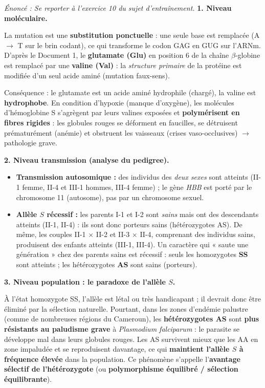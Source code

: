 \documentclass[11pt]{article}
\begin{document}
\begin{corrige}
\textit{Énoncé : Se reporter à l'exercice 10 du sujet d'entraînement.}
\tcblower
\textbf{1. Niveau moléculaire.}

La mutation est une \textbf{substitution ponctuelle} : une seule base est remplacée (A $\to$ T sur le brin codant), ce qui transforme le codon GAG en GUG sur l'ARNm. D'après le Document 1, le \textbf{glutamate (Glu)} en position 6 de la chaîne $\beta$-globine est remplacé par une \textbf{valine (Val)} : la \emph{structure primaire} de la protéine est modifiée d'un seul acide aminé (mutation faux-sens).

Conséquence : le glutamate est un acide aminé hydrophile (chargé), la valine est \textbf{hydrophobe}. En condition d'hypoxie (manque d'oxygène), les molécules d'hémoglobine S s'agrègent par leurs valines exposées et \textbf{polymérisent en fibres rigides} : les globules rouges se déforment en faucilles, se détruisent prématurément (anémie) et obstruent les vaisseaux (crises vaso-occlusives) $\to$ pathologie grave.

\textbf{2. Niveau transmission (analyse du pedigree).}
\begin{itemize}
    \item \textbf{Transmission autosomique :} des individus des \emph{deux sexes} sont atteints (II-1 femme, II-4 et III-1 hommes, III-4 femme) ; le gène \emph{HBB} est porté par le chromosome 11 (autosome), pas par un chromosome sexuel.
    \item \textbf{Allèle $S$ récessif :} les parents I-1 et I-2 sont \emph{sains} mais ont des descendants atteints (II-1, II-4) : ils sont donc porteurs sains (hétérozygotes AS). De même, les couples II-1 $\times$ II-2 et II-3 $\times$ II-4, comprenant des individus sains, produisent des enfants atteints (III-1, III-4). Un caractère qui « saute une génération » chez des parents sains est récessif : seuls les homozygotes \textbf{SS} sont atteints ; les hétérozygotes \textbf{AS} sont sains (porteurs).
\end{itemize}

\textbf{3. Niveau population : le paradoxe de l'allèle $S$.}

À l'état homozygote SS, l'allèle est létal ou très handicapant ; il devrait donc être éliminé par la sélection naturelle. Pourtant, dans les zones d'endémie palustre (comme de nombreuses régions du Cameroun), les \textbf{hétérozygotes AS} sont \textbf{plus résistants au paludisme grave} à \emph{Plasmodium falciparum} : le parasite se développe mal dans leurs globules rouges. Les AS survivent mieux que les AA en zone impaludée et se reproduisent davantage, ce qui \textbf{maintient l'allèle $S$ à fréquence élevée} dans la population. Ce phénomène s'appelle l'\textbf{avantage sélectif de l'hétérozygote} (ou \textbf{polymorphisme équilibré / sélection équilibrante}).


\end{corrige}
\end{document}
